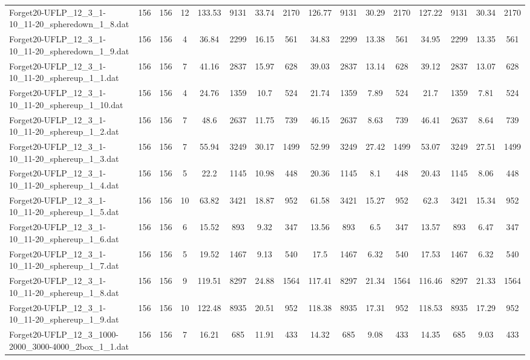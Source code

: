 \begin{sidewaystable}[!ht]
{\begin{tabular}{lccccccccccccccc}
Forget20-UFLP\_12\_3\_1-10\_11-20\_spheredown\_1\_8.dat & 156 & 156 & 12 & 133.53 & 9131 & 33.74 & 2170 & 126.77 & 9131 &  \textcolor{blue2}{30.29} & 2170 & 127.22 & 9131 & 30.34 & 2170 \\
Forget20-UFLP\_12\_3\_1-10\_11-20\_spheredown\_1\_9.dat & 156 & 156 & 4 & 36.84 & 2299 & 16.15 & 561 & 34.83 & 2299 & 13.38 & 561 & 34.95 & 2299 & 13.35 & 561 \\
Forget20-UFLP\_12\_3\_1-10\_11-20\_sphereup\_1\_1.dat & 156 & 156 & 7 & 41.16 & 2837 & 15.97 & 628 & 39.03 & 2837 & 13.14 & 628 & 39.12 & 2837 &  \textcolor{blue2}{13.07} & 628 \\
Forget20-UFLP\_12\_3\_1-10\_11-20\_sphereup\_1\_10.dat & 156 & 156 & 4 & 24.76 & 1359 & 10.7 & 524 & 21.74 & 1359 & 7.89 & 524 & 21.7 & 1359 & 7.81 & 524 \\
Forget20-UFLP\_12\_3\_1-10\_11-20\_sphereup\_1\_2.dat & 156 & 156 & 7 & 48.6 & 2637 & 11.75 & 739 & 46.15 & 2637 & 8.63 & 739 & 46.41 & 2637 & 8.64 & 739 \\
Forget20-UFLP\_12\_3\_1-10\_11-20\_sphereup\_1\_3.dat & 156 & 156 & 7 & 55.94 & 3249 & 30.17 & 1499 & 52.99 & 3249 &  \textcolor{blue2}{27.42} & 1499 & 53.07 & 3249 & 27.51 & 1499 \\
Forget20-UFLP\_12\_3\_1-10\_11-20\_sphereup\_1\_4.dat & 156 & 156 & 5 & 22.2 & 1145 & 10.98 & 448 & 20.36 & 1145 & 8.1 & 448 & 20.43 & 1145 &  \textcolor{blue2}{8.06} & 448 \\
Forget20-UFLP\_12\_3\_1-10\_11-20\_sphereup\_1\_5.dat & 156 & 156 & 10 & 63.82 & 3421 & 18.87 & 952 & 61.58 & 3421 &  \textcolor{blue2}{15.27} & 952 & 62.3 & 3421 & 15.34 & 952 \\
Forget20-UFLP\_12\_3\_1-10\_11-20\_sphereup\_1\_6.dat & 156 & 156 & 6 & 15.52 & 893 & 9.32 & 347 & 13.56 & 893 & 6.5 & 347 & 13.57 & 893 & 6.47 & 347 \\
Forget20-UFLP\_12\_3\_1-10\_11-20\_sphereup\_1\_7.dat & 156 & 156 & 5 & 19.52 & 1467 & 9.13 & 540 & 17.5 & 1467 & 6.32 & 540 & 17.53 & 1467 & 6.32 & 540 \\
Forget20-UFLP\_12\_3\_1-10\_11-20\_sphereup\_1\_8.dat & 156 & 156 & 9 & 119.51 & 8297 & 24.88 & 1564 & 117.41 & 8297 & 21.34 & 1564 & 116.46 & 8297 &  \textcolor{blue2}{21.33} & 1564 \\
Forget20-UFLP\_12\_3\_1-10\_11-20\_sphereup\_1\_9.dat & 156 & 156 & 10 & 122.48 & 8935 & 20.51 & 952 & 118.38 & 8935 & 17.31 & 952 & 118.53 & 8935 & 17.29 & 952 \\
Forget20-UFLP\_12\_3\_1000-2000\_3000-4000\_2box\_1\_1.dat & 156 & 156 & 7 & 16.21 & 685 & 11.91 & 433 & 14.32 & 685 & 9.08 & 433 & 14.35 & 685 & 9.03 & 433 \\

\end{tabular}}
\end{sidewaystable}
